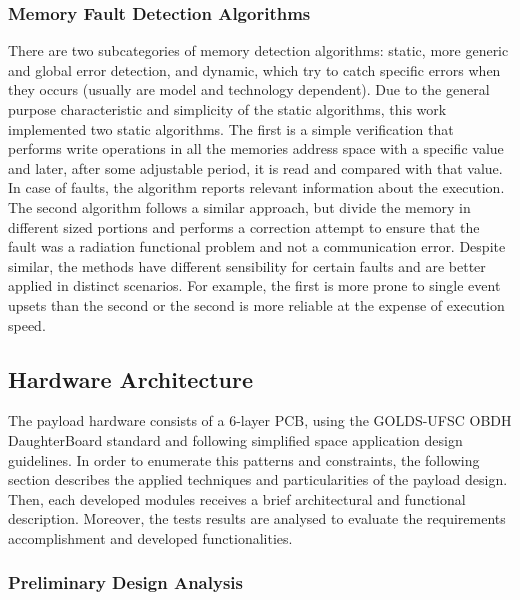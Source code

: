 
\subsubsection{Memory Fault Detection Algorithms}

There are two subcategories of memory detection algorithms: static, more generic and global error detection, and dynamic, which try to catch specific errors when they occurs (usually are model and technology dependent). Due to the general purpose characteristic and simplicity of the static algorithms, this work implemented two static algorithms. The first is a simple verification that performs write operations in all the memories address space with a specific value and later, after some adjustable period, it is read and compared with that value. In case of faults, the algorithm reports relevant information about the execution. The second algorithm follows a similar approach, but divide the memory in different sized portions and performs a correction attempt to ensure that the fault was a radiation functional problem and not a communication error. Despite similar, the methods have different sensibility for certain faults and are better applied in distinct scenarios. For example, the first is more prone to single event upsets than the second or the second is more reliable at the expense of execution speed.



\subsection{Hardware Architecture}

The payload hardware consists of a 6-layer PCB, using the GOLDS-UFSC OBDH DaughterBoard standard and following simplified space application design guidelines. In order to enumerate this patterns and constraints, the following section describes the applied techniques and particularities of the payload design. Then, each developed modules receives a brief architectural and functional description. Moreover, the tests results are analysed to evaluate the requirements accomplishment and developed functionalities.        



\subsubsection{Preliminary Design Analysis} \label{subsec:hard_design_analysis}

